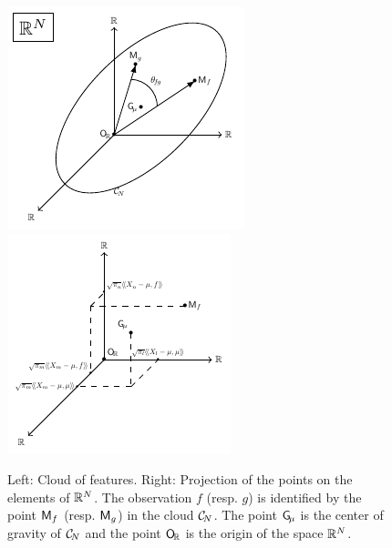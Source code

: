 \begin{figure}
    \centering
    \includegraphics[scale=1.2]{figures/cloud_features}
    \includegraphics[scale=1.2]{figures/cloud_features_proj}
    \caption{Left: Cloud of features. Right: Projection of the points on the elements of $\mathbb{R}^N$. The observation $f$ (resp. $g$) is identified by the point $\mathsf{M}_f$ (resp. $\mathsf{M}_g$) in the cloud $\mathcal{C}_{\!N}$. The point $\mathsf{G}_{\!\mu}$ is the center of gravity of $\mathcal{C}_{\!N}$ and the point $\mathsf{O}_{\!\mathbb{R}}$ is the origin of the space $\mathbb{R}^N$.}
    \label{fig:cloud_features}
\end{figure}

